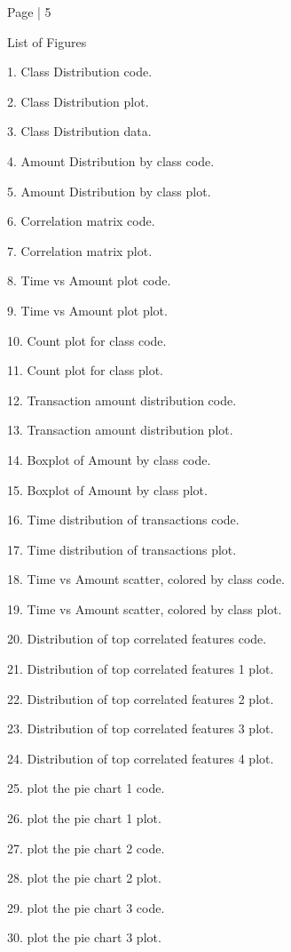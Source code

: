 \documentclass[11pt,a4paper]{article}
\begin{document}
Page | 5  

\newpage

\begin{center}
{\Large List of Figures }
\end{center}

1. Class Distribution code. 

2. Class Distribution plot. 

3. Class Distribution data. 

4. Amount Distribution by class code. 

5. Amount Distribution by class plot. 

6. Correlation matrix code. 

7. Correlation matrix plot. 

8. Time vs Amount plot code. 

9. Time vs Amount plot plot. 

10. Count plot for class code. 

11. Count plot for class plot. 

12. Transaction amount distribution code. 

13. Transaction amount distribution plot. 

14. Boxplot of Amount by class code. 

15. Boxplot of Amount by class plot. 

 16. Time distribution of transactions code. 

 17. Time distribution of transactions plot. 

18. Time vs Amount scatter, colored by class code. 

19. Time vs Amount scatter, colored by class plot. 

20. Distribution of top correlated features code. 

21. Distribution of top correlated features 1 plot. 

22. Distribution of top correlated features 2 plot. 

23. Distribution of top correlated features 3 plot. 

24. Distribution of top correlated features 4 plot. 

25. plot the pie chart 1 code. 

26. plot the pie chart 1 plot. 

27. plot the pie chart 2 code. 

28. plot the pie chart 2 plot. 

29. plot the pie chart 3 code. 

30. plot the pie chart 3 plot. 
\end{document}

